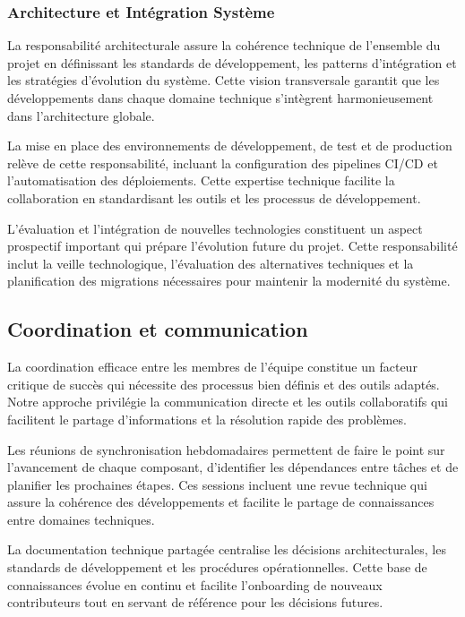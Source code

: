 \subsubsection{Architecture et Intégration Système}

La responsabilité architecturale assure la cohérence technique de l'ensemble du projet en définissant les standards de développement, les patterns d'intégration et les stratégies d'évolution du système. Cette vision transversale garantit que les développements dans chaque domaine technique s'intègrent harmonieusement dans l'architecture globale.

La mise en place des environnements de développement, de test et de production relève de cette responsabilité, incluant la configuration des pipelines CI/CD et l'automatisation des déploiements. Cette expertise technique facilite la collaboration en standardisant les outils et les processus de développement.

L'évaluation et l'intégration de nouvelles technologies constituent un aspect prospectif important qui prépare l'évolution future du projet. Cette responsabilité inclut la veille technologique, l'évaluation des alternatives techniques et la planification des migrations nécessaires pour maintenir la modernité du système.

\subsection{Coordination et communication}

La coordination efficace entre les membres de l'équipe constitue un facteur critique de succès qui nécessite des processus bien définis et des outils adaptés. Notre approche privilégie la communication directe et les outils collaboratifs qui facilitent le partage d'informations et la résolution rapide des problèmes.

Les réunions de synchronisation hebdomadaires permettent de faire le point sur l'avancement de chaque composant, d'identifier les dépendances entre tâches et de planifier les prochaines étapes. Ces sessions incluent une revue technique qui assure la cohérence des développements et facilite le partage de connaissances entre domaines techniques.

La documentation technique partagée centralise les décisions architecturales, les standards de développement et les procédures opérationnelles. Cette base de connaissances évolue en continu et facilite l'onboarding de nouveaux contributeurs tout en servant de référence pour les décisions futures.

